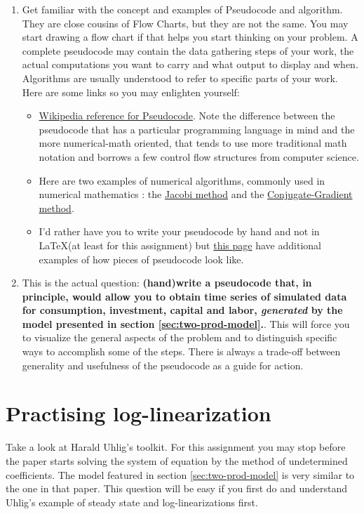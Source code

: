 \documentclass[11pt]{article}
\begin{document}
\begin{enumerate}
\item Get familiar with the concept and examples of Pseudocode and algorithm. They are close cousins of Flow Charts, but they are not the same. You may start drawing a flow chart if that helps you start  thinking on your problem. A complete pseudocode may contain the data gathering steps of your work, the actual computations you want to carry and what output to display and when. Algorithms are usually understood to refer to specific parts of your work. Here are some links so you may enlighten yourself:
     \begin{itemize}
     \item \href{https://es.wikipedia.org/wiki/Pseudoc%C3%B3digo}{ Wikipedia reference for Pseudocode}. Note the difference between the pseudocode that has a particular programming language in mind and the more numerical-math oriented, that tends to use more traditional math notation and borrows a few control flow structures from computer science.
     \item Here are two examples of numerical algorithms, commonly used in numerical mathematics : the \href{https://en.wikipedia.org/wiki/Jacobi_method}{Jacobi method} and the \href{https://en.wikipedia.org/wiki/Conjugate_gradient_method}{Conjugate-Gradient method}.
     \item I'd rather have you to write your pseudocode by hand and not in \LaTeX (at least for this assignment) but \href{https://en.wikibooks.org/wiki/LaTeX/Algorithms_and_Pseudocode}{this page}  have additional examples of how pieces of pseudocode look like. 
     \end{itemize}
\item This is the actual question: \textbf{(hand)write a pseudocode that, in principle, would allow you to obtain time series of simulated data for consumption, investment, capital and labor, \emph{generated} by the model presented in section \ref{sec:two-prod-model}.}. This will force you to visualize the general aspects of the problem and to distinguish specific ways to accomplish some of the steps. There is always a trade-off between generality and usefulness of the pseudocode as a guide for action.      
\end{enumerate}

\section{Practising log-linearization}
Take a look at Harald Uhlig's toolkit. For this assignment you may stop before the paper starts solving the system of equation by the method of undetermined coefficients. The model featured in section \ref{sec:two-prod-model} is very similar to the one in that paper. This question will be easy if you first do and understand Uhlig's example of steady state and log-linearizations first.
\end{document}
